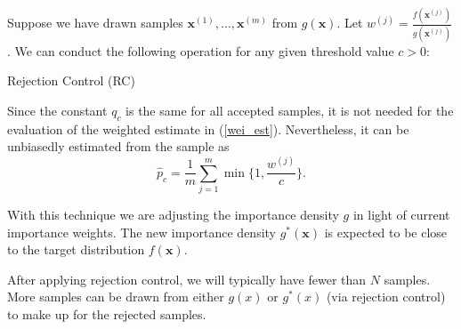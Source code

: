 \documentclass[times, utf8, diplomski]{fer}
\begin{document}
Suppose we have drawn samples $\mathbf{x}^{(1)}, \ldots, \mathbf{x}^{(m)}$ from $g(\mathbf{x})$. Let $w^{(j)} =  \frac{f(\mathbf{x}^{(j)})}{g(\mathbf{x}^{(j)})}$. We can conduct the following operation for any given threshold value $c > 0$:
\vspace{5mm}

\begin{algorithm}[H]
 \caption{Rejection Control (RC)}
 \label{RC}
\end{algorithm}
\vspace{5mm}

Since the constant $q_c$ is the same for all accepted samples, it is not needed for the  evaluation of the weighted estimate in (\ref{wei_est}). Nevertheless, it can be unbiasedly estimated \cite{Liu} from the sample as 
\begin{equation}
\hat{p}_{c} = \frac{1}{m} \sum_{j = 1}^{m} \min  \Big \{ {1, \frac{w^{(j)}}{c}} \Big \}.
\end{equation}

With this technique we are adjusting the importance density $g$  in light of current importance weights. The new importance density $g^{*}(\mathbf{x})$ is expected to be close to the target distribution $f(\mathbf{x})$.

After applying rejection control, we will typically have fewer than $N$ samples. More samples can be drawn from either $g(x)$ or $g^{*}(x)$ (via rejection control) to make up for the rejected samples. 
\end{document}
